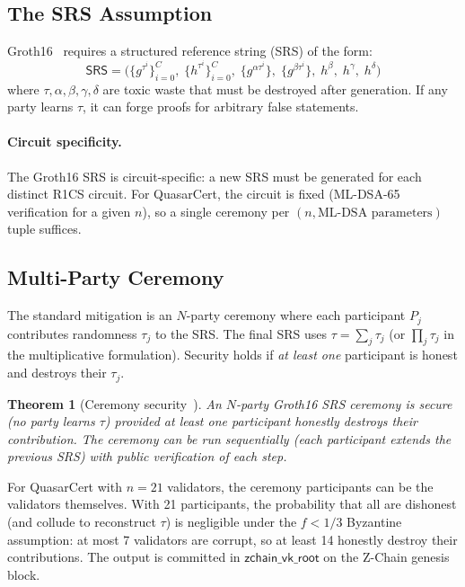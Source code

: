 \documentclass[11pt]{article}
\newtheorem{theorem}{Theorem}
\begin{document}
\subsection{The SRS Assumption}

Groth16~\cite{groth2016} requires a structured reference string (SRS)
of the form:
\[
  \mathsf{SRS} = \bigl(
    \{g^{\tau^i}\}_{i=0}^{C},\;
    \{h^{\tau^i}\}_{i=0}^{C},\;
    \{g^{\alpha \tau^i}\},\;
    \{g^{\beta \tau^i}\},\;
    h^\beta,\; h^\gamma,\; h^\delta
  \bigr)
\]
where $\tau, \alpha, \beta, \gamma, \delta$ are toxic waste that must
be destroyed after generation.  If any party learns $\tau$, it can
forge proofs for arbitrary false statements.

\paragraph{Circuit specificity.}
The Groth16 SRS is circuit-specific: a new SRS must be generated for
each distinct R1CS circuit.  For QuasarCert, the circuit is fixed
(ML-DSA-65 verification for a given $n$), so a single ceremony per
$(n, \text{ML-DSA parameters})$ tuple suffices.

\subsection{Multi-Party Ceremony}

The standard mitigation is an $N$-party ceremony where each
participant $P_j$ contributes randomness $\tau_j$ to the SRS.  The
final SRS uses $\tau = \sum_j \tau_j$ (or $\prod_j \tau_j$ in the
multiplicative formulation).  Security holds if \emph{at least one}
participant is honest and destroys their $\tau_j$.

\begin{theorem}[Ceremony security~\cite{bowe2017}]
An $N$-party Groth16 SRS ceremony is secure (no party learns $\tau$)
provided at least one participant honestly destroys their contribution.
The ceremony can be run sequentially (each participant extends the
previous SRS) with public verification of each step.
\end{theorem}

For QuasarCert with $n = 21$ validators, the ceremony participants can
be the validators themselves.  With 21 participants, the probability
that all are dishonest (and collude to reconstruct $\tau$) is
negligible under the $f < 1/3$ Byzantine assumption: at most 7
validators are corrupt, so at least 14 honestly destroy their
contributions.  The output is committed in
$\mathsf{zchain\_vk\_root}$ on the Z-Chain genesis block.
\end{document}
